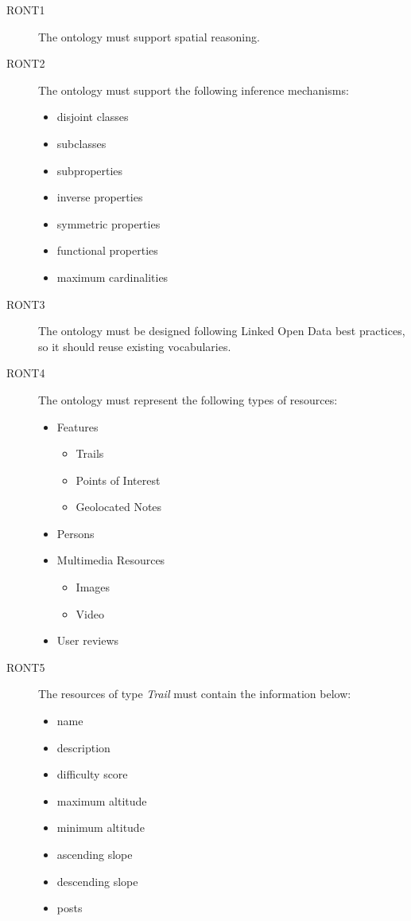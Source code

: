\begin{description}
\item[RONT1] The ontology must support spatial reasoning.
\item[RONT2] The ontology must support the following inference mechanisms:
\begin{itemize}
\item disjoint classes
\item subclasses
\item subproperties
\item inverse properties
\item symmetric properties
\item functional properties
\item maximum cardinalities
\end{itemize}
\item[RONT3] The ontology must be designed following Linked Open Data best practices, so it should reuse existing vocabularies.
\item[RONT4] The ontology must represent the following types of resources:
\begin{itemize}
 \item Features
 \begin{itemize}
  \item Trails
  \item Points of Interest
  \item Geolocated Notes
 \end{itemize}
 \item Persons
 \item Multimedia Resources
 \begin{itemize}
  \item Images
  \item Video
 \end{itemize}
 \item User reviews
\end{itemize}
\item[RONT5] The resources of type \textit{Trail} must contain the information below:
\begin{itemize}
\item name
\item description
\item difficulty score
\item maximum altitude
\item minimum altitude
\item ascending slope
\item descending slope
\item posts

\end{itemize}
\end{description}
